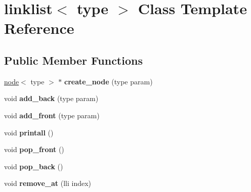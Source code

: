 \hypertarget{classlinklist}{}\section{linklist$<$ type $>$ Class Template Reference}
\label{classlinklist}
\subsection*{Public Member Functions}
\begin{DoxyCompactItemize}
\item 
\hyperlink{classnode}{node}$<$ type $>$ $\ast$ {\bfseries create\+\_\+node} (type param)\hypertarget{classlinklist_a531b3511f28037966391e4dbbfdfe312}{}\label{classlinklist_a531b3511f28037966391e4dbbfdfe312}

\item 
void {\bfseries add\+\_\+back} (type param)\hypertarget{classlinklist_ab159dfa554cc59f8326038a73cbbcd98}{}\label{classlinklist_ab159dfa554cc59f8326038a73cbbcd98}

\item 
void {\bfseries add\+\_\+front} (type param)\hypertarget{classlinklist_a31c68adaa7dfcaf411588c616dd6fcd8}{}\label{classlinklist_a31c68adaa7dfcaf411588c616dd6fcd8}

\item 
void {\bfseries printall} ()\hypertarget{classlinklist_a56335bf6dea112a7455a80001c3d1d7b}{}\label{classlinklist_a56335bf6dea112a7455a80001c3d1d7b}

\item 
void {\bfseries pop\+\_\+front} ()\hypertarget{classlinklist_a463f2ab29ab4e374d19dade690f8f69c}{}\label{classlinklist_a463f2ab29ab4e374d19dade690f8f69c}

\item 
void {\bfseries pop\+\_\+back} ()\hypertarget{classlinklist_a51f7840fd93b31f4cd84e8c7976f2a0b}{}\label{classlinklist_a51f7840fd93b31f4cd84e8c7976f2a0b}

\item 
void {\bfseries remove\+\_\+at} (lli index)\hypertarget{classlinklist_a3d8b96fab8710b6397ad673013b2973b}{}\label{classlinklist_a3d8b96fab8710b6397ad673013b2973b}

\end{DoxyCompactItemize}
